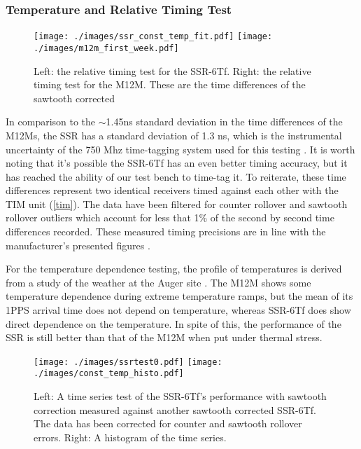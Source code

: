 \subsubsection{Temperature and Relative Timing Test} %


\begin{figure}[H]
\centering
\texttt{[image: ./images/ssr\_const\_temp\_fit.pdf]}
\texttt{[image: ./images/m12m\_first\_week.pdf]}
\caption[SSR-6Tf Relative Timing]{Left: the relative timing test for the SSR-6Tf. Right: the relative timing test for the M12M. These are the time differences of the sawtooth corrected }
\label{ssrtest0}
\end{figure}
In comparison to the $\sim$1.45ns standard deviation in the time differences of the
M12Ms, the SSR has a standard deviation of 1.3 ns, which is the
instrumental uncertainty of the 750 Mhz time-tagging system used for
this testing \cite{brandt}. It is worth noting that it's possible the
SSR-6Tf has an even better timing accuracy, but it has reached the
ability of our test bench to time-tag it. To reiterate, these time differences represent two identical receivers timed against each other with the TIM unit (\autoref{tim}). The data have been filtered
for counter rollover and sawtooth rollover outliers which account for
less that 1\% of the second by second time differences recorded. These measured timing precisions are in line with the manufacturer's presented figures \cite{ssr,m12mspec}.

For the temperature dependence testing, the profile of temperatures is
derived from a study of the weather at the Auger site \cite{brandt}. The M12M shows
some temperature dependence during extreme temperature ramps, but the
mean of its 1PPS arrival time does not depend on temperature, whereas
SSR-6Tf does show direct dependence on the temperature. In spite of
this, the performance of the SSR is still better than that of the M12M
when put under thermal stress.

\begin{figure}[H]
\centering
\texttt{[image: ./images/ssrtest0.pdf]}
\texttt{[image: ./images/const\_temp\_histo.pdf]}
\caption[SSR-6Tf Relative Timing]{Left: A time series test of the SSR-6Tf's performance with sawtooth correction measured against another sawtooth corrected SSR-6Tf. The data has been corrected for counter and sawtooth rollover errors. Right: A histogram of the time series.}
\label{ssrtest0}
\end{figure}


